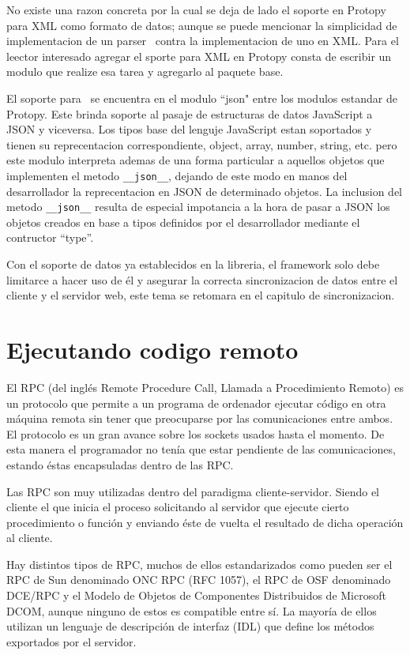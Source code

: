No existe una razon concreta por la cual se deja de lado el soporte en Protopy
para XML como formato de datos; aunque se puede mencionar la simplicidad de
implementacion de un parser \JSON\ contra la implementacion de uno en XML.
Para el leector interesado agregar el sporte para XML en Protopy consta de
escribir un modulo que realize esa tarea y agregarlo al paquete base.

El soporte para \JSON\ se encuentra en el modulo ``json" entre los modulos
estandar de Protopy. Este brinda soporte al pasaje de estructuras de datos
JavaScript a JSON y viceversa.
Los tipos base del lenguje JavaScript estan soportados y tienen su
reprecentacion correspondiente, object, array, number, string, etc. pero este
modulo interpreta ademas de una forma particular a aquellos objetos que
implementen el metodo \verb|__json__|, dejando de este modo en manos del
desarrollador la reprecentacion en JSON de determinado objetos.
La inclusion del metodo \verb|__json__|  resulta de especial impotancia a la
hora de pasar a JSON los objetos creados en base a tipos definidos por el
desarrollador mediante el contructor ``type''.

Con el soporte de datos ya establecidos en la libreria, el framework solo
debe limitarce a hacer uso de él y asegurar la correcta sincronizacion de datos
entre el cliente y el servidor web, este tema se retomara en el capitulo de
sincronizacion.

\section{Ejecutando codigo remoto}
El RPC (del inglés Remote Procedure Call, Llamada a Procedimiento Remoto) es un
protocolo que permite a un programa de ordenador ejecutar código en otra máquina
remota sin tener que preocuparse por las comunicaciones entre ambos. El protocolo
es un gran avance sobre los sockets usados hasta el momento. De esta manera el
programador no tenía que estar pendiente de las comunicaciones, estando éstas
encapsuladas dentro de las RPC.

Las RPC son muy utilizadas dentro del paradigma cliente-servidor. Siendo el
cliente el que inicia el proceso solicitando al servidor que ejecute cierto
procedimiento o función y enviando éste de vuelta el resultado de dicha operación
al cliente.

Hay distintos tipos de RPC, muchos de ellos estandarizados como pueden ser el RPC
de Sun denominado ONC RPC (RFC 1057), el RPC de OSF denominado DCE/RPC y el
Modelo de Objetos de Componentes Distribuidos de Microsoft DCOM, aunque ninguno
de estos es compatible entre sí. La mayoría de ellos utilizan un lenguaje de
descripción de interfaz (IDL) que define los métodos exportados por el servidor.


